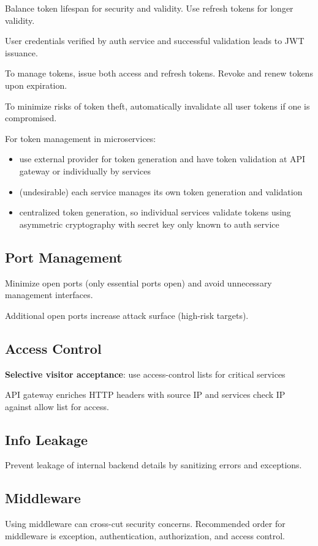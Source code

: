 \documentclass[11pt]{article}
\begin{document}
Balance token lifespan for security and validity.
Use refresh tokens for longer validity.

User credentials verified by auth service and
successful validation leads to JWT issuance.

To manage tokens, issue both access and refresh tokens.
Revoke and renew tokens upon expiration.

To minimize risks of token theft, automatically invalidate
all user tokens if one is compromised.

For token management in microservices:
\begin{itemize}
\item use external provider for token generation and have token
validation at API gateway or individually by services
\item (undesirable) each service manages its own token
generation and validation
\item centralized token generation, so individual services
validate tokens using asymmetric cryptography with
secret key only known to auth service
\end{itemize}
\subsection{Port Management}
\label{sec:org2831717}
Minimize open ports (only essential ports open) and
avoid unnecessary management interfaces.

Additional open ports increase attack surface (high-risk
targets).
\subsection{Access Control}
\label{sec:org34983d3}
\textbf{Selective visitor acceptance}: use access-control lists for critical services

API gateway enriches HTTP headers with source IP and services check IP
against allow list for access.
\subsection{Info Leakage}
\label{sec:org5a7d9d4}
Prevent leakage of internal backend details by sanitizing errors and exceptions.
\subsection{Middleware}
\label{sec:org2b136ca}
Using middleware can cross-cut security concerns.
Recommended order for middleware is exception, authentication, authorization, and
access control.
\end{document}
